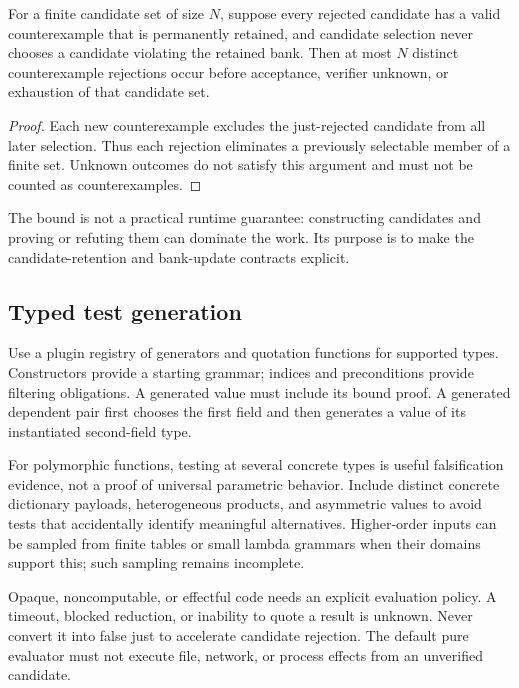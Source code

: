 \begin{proposition}
For a finite candidate set of size $N$, suppose every rejected candidate has a
valid counterexample that is permanently retained, and candidate selection
never chooses a candidate violating the retained bank. Then at most $N$
distinct counterexample rejections occur before acceptance, verifier unknown,
or exhaustion of that candidate set.
\end{proposition}
\begin{proof}
Each new counterexample excludes the just-rejected candidate from all later
selection. Thus each rejection eliminates a previously selectable member of a
finite set. Unknown outcomes do not satisfy this argument and must not be
counted as counterexamples.
\end{proof}

The bound is not a practical runtime guarantee: constructing candidates and
proving or refuting them can dominate the work. Its purpose is to make the
candidate-retention and bank-update contracts explicit.

\subsection{Typed test generation}

Use a plugin registry of generators and quotation functions for supported
types. Constructors provide a starting grammar; indices and preconditions
provide filtering obligations. A generated  value must include its
bound proof. A generated dependent pair first chooses the first field and
then generates a value of its instantiated second-field type.

For polymorphic functions, testing at several concrete types is useful
falsification evidence, not a proof of universal parametric behavior. Include
distinct concrete dictionary payloads, heterogeneous products, and asymmetric
values to avoid tests that accidentally identify meaningful alternatives.
Higher-order inputs can be sampled from finite tables or small lambda grammars
when their domains support this; such sampling remains incomplete.

Opaque, noncomputable, or effectful code needs an explicit evaluation policy.
A timeout, blocked reduction, or inability to quote a result is unknown. Never
convert it into false just to accelerate candidate rejection. The default
pure evaluator must not execute file, network, or process effects from an
unverified candidate.


